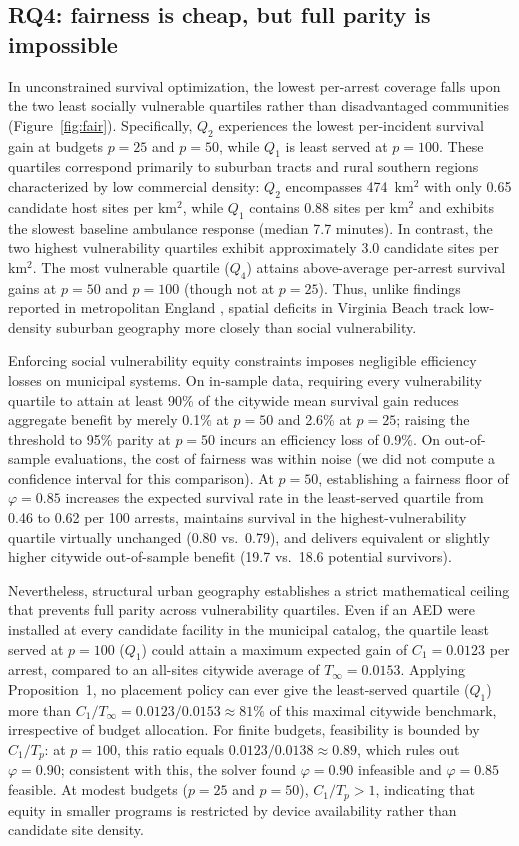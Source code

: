 \documentclass[11pt]{article}
\begin{document}
\subsection{RQ4: fairness is cheap, but full parity is impossible}
In unconstrained survival optimization, the lowest per-arrest coverage falls upon the two least socially vulnerable quartiles rather than disadvantaged communities (Figure~\ref{fig:fair}). Specifically, $Q_2$ experiences the lowest per-incident survival gain at budgets $p=25$ and $p=50$, while $Q_1$ is least served at $p=100$. These quartiles correspond primarily to suburban tracts and rural southern regions characterized by low commercial density: $Q_2$ encompasses 474~km$^2$ with only 0.65 candidate host sites per km$^2$, while $Q_1$ contains 0.88 sites per km$^2$ and exhibits the slowest baseline ambulance response (median 7.7 minutes). In contrast, the two highest vulnerability quartiles exhibit approximately 3.0 candidate sites per km$^2$. The most vulnerable quartile ($Q_4$) attains above-average per-arrest survival gains at $p=50$ and $p=100$ (though not at $p=25$). Thus, unlike findings reported in metropolitan England \cite{brown2025}, spatial deficits in Virginia Beach track low-density suburban geography more closely than social vulnerability.

Enforcing social vulnerability equity constraints imposes negligible efficiency losses on municipal systems. On in-sample data, requiring every vulnerability quartile to attain at least 90\% of the citywide mean survival gain reduces aggregate benefit by merely 0.1\% at $p=50$ and 2.6\% at $p=25$; raising the threshold to 95\% parity at $p=50$ incurs an efficiency loss of 0.9\%. On out-of-sample evaluations, the cost of fairness was within noise (we did not compute a confidence interval for this comparison). At $p=50$, establishing a fairness floor of $\varphi=0.85$ increases the expected survival rate in the least-served quartile from 0.46 to 0.62 per 100 arrests, maintains survival in the highest-vulnerability quartile virtually unchanged (0.80 vs.\ 0.79), and delivers equivalent or slightly higher citywide out-of-sample benefit (19.7 vs.\ 18.6 potential survivors).

Nevertheless, structural urban geography establishes a strict mathematical ceiling that prevents full parity across vulnerability quartiles. Even if an AED were installed at every candidate facility in the municipal catalog, the quartile least served at $p=100$ ($Q_1$) could attain a maximum expected gain of $C_1=0.0123$ per arrest, compared to an all-sites citywide average of $T_\infty=0.0153$. Applying Proposition~1, no placement policy can ever give the least-served quartile ($Q_1$) more than $C_1/T_\infty = 0.0123/0.0153 \approx 81\%$ of this maximal citywide benchmark, irrespective of budget allocation. For finite budgets, feasibility is bounded by $C_1/T_p$: at $p=100$, this ratio equals $0.0123/0.0138 \approx 0.89$, which rules out $\varphi=0.90$; consistent with this, the solver found $\varphi=0.90$ infeasible and $\varphi=0.85$ feasible. At modest budgets ($p=25$ and $p=50$), $C_1/T_p > 1$, indicating that equity in smaller programs is restricted by device availability rather than candidate site density.
\end{document}
